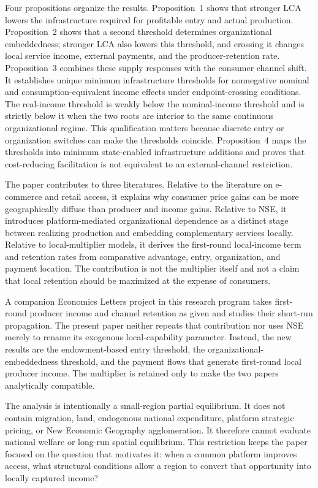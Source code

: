 \documentclass[11pt]{article}
\theoremstyle{definition}
\theoremstyle{remark}
\begin{document}
Four propositions organize the results.  Proposition~1 shows that stronger
LCA lowers the infrastructure required for profitable entry and actual
production.  Proposition~2 shows
that a second threshold determines organizational embeddedness; stronger LCA
also lowers this threshold, and crossing it changes local service income,
external payments, and the producer-retention rate.  Proposition~3 combines
these supply responses with the consumer channel shift.  It establishes
unique minimum infrastructure thresholds for nonnegative nominal and
consumption-equivalent income effects under endpoint-crossing conditions.
The real-income threshold is weakly below the nominal-income threshold and is
strictly below it when the two roots are interior to the same continuous
organizational regime.  This qualification matters because discrete entry or
organization switches can make the thresholds coincide.  Proposition~4 maps
the thresholds into minimum state-enabled infrastructure additions and proves
that cost-reducing facilitation is not equivalent to an external-channel
restriction.

The paper contributes to three literatures.  Relative to the literature on
e-commerce and retail access, it explains why consumer price gains can be more
geographically diffuse than producer and income gains.  Relative to NSE, it
introduces platform-mediated organizational dependence as a distinct stage
between realizing production and embedding complementary services locally.
Relative to local-multiplier models, it derives the first-round local-income
term and retention rates from comparative advantage, entry, organization, and
payment location.  The contribution is not the multiplier itself and not a
claim that local retention should be maximized at the expense of consumers.

A companion Economics Letters project in this research program takes
first-round producer income and channel retention as given and studies their
short-run propagation.  The present paper neither repeats that contribution
nor uses NSE merely to rename its exogenous local-capability parameter.
Instead, the new results are the endowment-based entry threshold, the
organizational-embeddedness threshold, and the payment flows that generate
first-round local producer income.  The multiplier is retained only to make
the two papers analytically compatible.

The analysis is intentionally a small-region partial equilibrium.  It does not
contain migration, land, endogenous national expenditure, platform strategic
pricing, or New Economic Geography agglomeration.  It therefore cannot
evaluate national welfare or long-run spatial equilibrium.  This restriction
keeps the paper focused on the question that motivates it: when a common
platform improves access, what structural conditions allow a region to
convert that opportunity into locally captured income?
\end{document}
